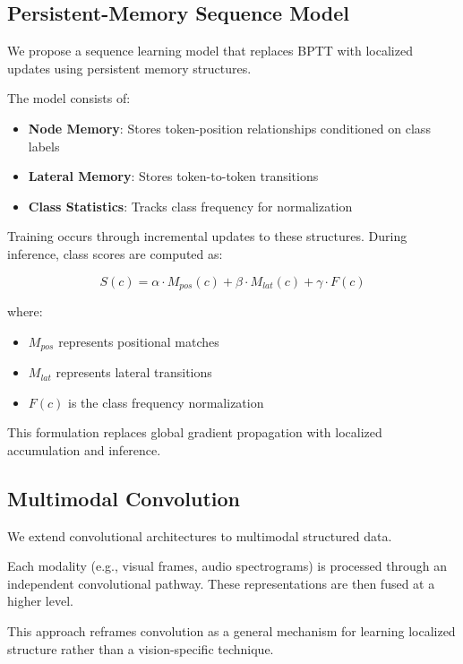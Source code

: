\documentclass{article}
\begin{document}
	\subsection{Persistent-Memory Sequence Model}
	
	We propose a sequence learning model that replaces BPTT with localized updates using persistent memory structures.
	
	The model consists of:
	
	\begin{itemize}
		\item \textbf{Node Memory}: Stores token-position relationships conditioned on class labels
		\item \textbf{Lateral Memory}: Stores token-to-token transitions
		\item \textbf{Class Statistics}: Tracks class frequency for normalization
	\end{itemize}
	
	Training occurs through incremental updates to these structures. During inference, class scores are computed as:
	
	\begin{equation}
		S(c) = \alpha \cdot M_{pos}(c) + \beta \cdot M_{lat}(c) + \gamma \cdot F(c)
	\end{equation}
	
	where:
	\begin{itemize}
		\item $M_{pos}$ represents positional matches
		\item $M_{lat}$ represents lateral transitions
		\item $F(c)$ is the class frequency normalization
	\end{itemize}
	
	This formulation replaces global gradient propagation with localized accumulation and inference.
	
	\subsection{Multimodal Convolution}
	
	We extend convolutional architectures to multimodal structured data.
	
	Each modality (e.g., visual frames, audio spectrograms) is processed through an independent convolutional pathway. These representations are then fused at a higher level.
	
	This approach reframes convolution as a general mechanism for learning localized structure rather than a vision-specific technique.
\end{document}

